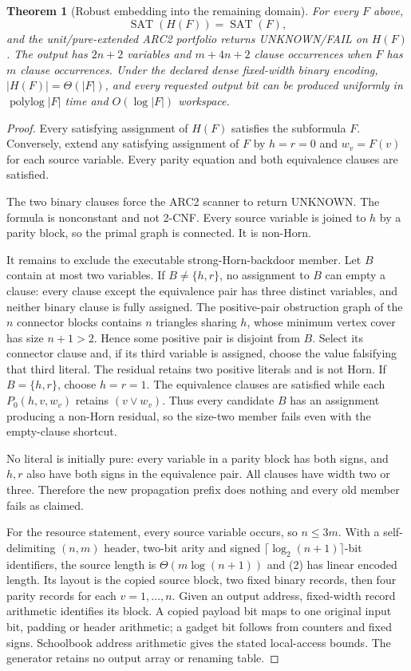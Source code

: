 \documentclass[11pt]{article}
\newtheorem{theorem}{Theorem}
\begin{document}
\begin{theorem}[Robust embedding into the remaining domain]
For every $F$ above,
\[
 \operatorname{SAT}(H(F))=\operatorname{SAT}(F),
\]
and the unit/pure-extended ARC2 portfolio returns UNKNOWN/FAIL on $H(F)$.
The output has $2n+2$ variables and $m+4n+2$ clause occurrences when $F$
has $m$ clause occurrences. Under the declared dense fixed-width binary encoding,
$|H(F)|=\Theta(|F|)$, and every requested output bit can be produced
uniformly in $\operatorname{polylog}|F|$ time and $O(\log|F|)$ workspace.
\end{theorem}
\begin{proof}
Every satisfying assignment of $H(F)$ satisfies the subformula $F$.
Conversely, extend any satisfying assignment of $F$ by $h=r=0$
and $w_v=F(v)$ for each source variable. Every parity
equation and both equivalence clauses are satisfied.

The two binary clauses force the ARC2 scanner to return UNKNOWN. The
formula is nonconstant and not 2-CNF. Every source variable is joined
to $h$ by a parity block, so the primal graph is connected. It is
non-Horn.

It remains to exclude the executable strong-Horn-backdoor member.
Let $B$ contain at most two variables. If $B\ne\{h,r\}$, no assignment
to $B$ can empty a clause: every clause except the equivalence pair has
three distinct variables, and neither binary clause is fully assigned.
The positive-pair obstruction graph of the $n$ connector blocks contains
$n$ triangles sharing $h$, whose minimum vertex cover has size $n+1>2$.
Hence some positive pair is disjoint from $B$. Select its connector
clause and, if its third variable is assigned, choose the value falsifying
that third literal. The residual retains two positive literals and is
not Horn. If $B=\{h,r\}$, choose $h=r=1$. The equivalence clauses are
satisfied while each $P_0(h,v,w_v)$ retains $(v\vee w_v)$. Thus every candidate
$B$ has an assignment producing a non-Horn residual, so the size-two
member fails even with the empty-clause shortcut.

No literal is initially pure: every variable in a parity block has both
signs, and $h,r$ also have both signs in the equivalence pair. All clauses
have width two or three. Therefore the new propagation prefix does
nothing and every old member fails as claimed.

For the resource statement, every source variable occurs, so $n\le3m$.
With a self-delimiting $(n,m)$ header, two-bit arity and signed
$\lceil\log_2(n+1)\rceil$-bit identifiers, the source length is
$\Theta(m\log(n+1))$ and (2) has linear encoded length. Its layout is
the copied source block, two fixed binary records, then four parity
records for each $v=1,\ldots,n$.
Given an output address, fixed-width record arithmetic identifies its
block. A copied payload bit maps to one original input bit, padding or
header arithmetic; a gadget bit follows from counters and fixed signs.
Schoolbook address arithmetic gives the stated local-access bounds.
The generator retains no output array or renaming table.
\end{proof}
\end{document}
